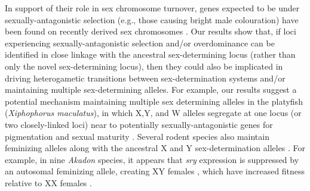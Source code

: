 \documentclass[12pt]{article}
\begin{document}
In support of their role in sex chromosome turnover, genes expected to be under sexually-antagonistic selection (e.g., those causing bright male colouration) have been found on recently derived sex chromosomes \citep{Lindholm:2002dw,Tripathi:2009cw,Ser:2010iq}. 
Our results show that, if loci experiencing sexually-antagonistic selection and/or overdominance can be identified in close linkage with the ancestral sex-determining locus (rather than only the novel sex-determining locus), then they could also be implicated in driving heterogametic transitions between sex-determination systems and/or maintaining multiple sex-determining alleles. 
For example, our results suggest a potential mechanism maintaining multiple sex determining alleles in the platyfish (\textit{Xiphophorus maculatus}), in which X,Y, and W alleles segregate at one locus (or two closely-linked loci) near to potentially sexually-antagonistic genes for pigmentation and sexual maturity \citep{Kallman1965,Kallman1968, Volff2001, Schultheis2006}.
Several rodent species also maintain feminizing alleles along with the ancestral X and Y sex-determination alleles \citep[reviewed in][]{Fredga1994}. 
For example, in nine \textit{Akadon} species, it appears that \textit{sry} expression is suppressed by an autosomal feminizing allele, creating XY females \citep{Bianchi2002,Sanchez2010}, which have increased fitness relative to XX females \citep{Hoekstra2001}. 
\end{document}
